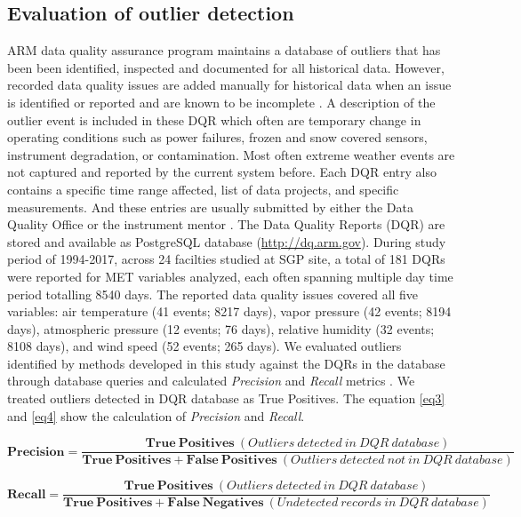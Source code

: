 \subsection{Evaluation of outlier detection}
ARM data quality assurance program maintains a database of outliers that
has been been identified, inspected and documented for all historical
data. However, recorded data quality
issues are added manually for historical data when an issue is
identified or reported and are known to be incomplete \cite{mccord2016arm}. 
A description of the outlier event is included in these DQR which often
are temporary change in operating conditions such as power failures, frozen 
and snow covered sensors, instrument degradation, or contamination. 
Most often extreme weather events are not captured and reported by the
current system before. Each DQR entry also contains a specific time range affected, 
list of data projects, and specific measurements. And these entries 
are usually submitted by either the Data Quality Office \cite{peppler2016arm} 
or the instrument mentor \cite{cress2016deploying}. 
The Data Quality Reports (DQR) are stored and available as PostgreSQL
database (\url{http://dq.arm.gov}). 
During study period of 1994-2017, across 24 facilties studied at SGP
site, a total of 181 DQRs were reported 
for MET variables analyzed, each often spanning multiple day time
period totalling 8540 days. The reported data quality issues covered all five variables: air
temperature (41 events; 8217 days), vapor pressure (42 events; 8194
days), atmospheric pressure (12 events; 76 days), relative humidity (32
events; 8108 days), and wind speed (52 events; 265 days).  
We evaluated outliers identified by methods developed in this study against the DQRs in the
database through database queries and calculated \textit{Precision} and \textit{Recall}
metrics \cite{perry1955machine}. We treated outliers detected in DQR database as True Positives. 
The equation \ref{eq3} and \ref{eq4} show the calculation of \textit{Precision} and \textit{Recall}.

\begin{table}[ht]
\begin{equation}\label{eq3}
\mathbf{Precision} = \frac{\mathbf{True\ Positives}\ (Outliers\ detected\ in\ DQR\ database)}{\mathbf{True\ Positives + False\ Positives}\ (Outliers\ detected\ not\ in\ DQR\ database)}
\end{equation}

\begin{equation}\label{eq4}
\mathbf{Recall} = \frac{\mathbf{True\ Positives}\ (Outliers\ detected\ in\ DQR\ database)}{\mathbf{True\ Positives + False\ Negatives}\ (Undetected\ records\ in\ DQR\ database)}
\end{equation}
\end{table}

